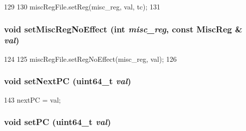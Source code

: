 \begin{DoxyCode}
129     {
130         miscRegFile.setReg(misc_reg, val, tc);
131     }
\end{DoxyCode}
\hypertarget{structOzoneThreadState_a763517aaea2f3decbc1ef9d064216b6f}{
\subsubsection[{setMiscRegNoEffect}]{\setlength{\rightskip}{0pt plus 5cm}void setMiscRegNoEffect (int {\em misc\_\-reg}, \/  const {\bf MiscReg} \& {\em val})}}
\label{structOzoneThreadState_a763517aaea2f3decbc1ef9d064216b6f}



\begin{DoxyCode}
124     {
125         miscRegFile.setRegNoEffect(misc_reg, val);
126     }
\end{DoxyCode}
\hypertarget{structOzoneThreadState_ac01bbbec5b2a7338e18d05322ba78cd3}{
\subsubsection[{setNextPC}]{\setlength{\rightskip}{0pt plus 5cm}void setNextPC (uint64\_\-t {\em val})}}
\label{structOzoneThreadState_ac01bbbec5b2a7338e18d05322ba78cd3}



\begin{DoxyCode}
143     { nextPC = val; }
\end{DoxyCode}
\hypertarget{structOzoneThreadState_a27cf930ee8c23222a063cdc302aa0efb}{
\subsubsection[{setPC}]{\setlength{\rightskip}{0pt plus 5cm}void setPC (uint64\_\-t {\em val})}}
\label{structOzoneThreadState_a27cf930ee8c23222a063cdc302aa0efb}



